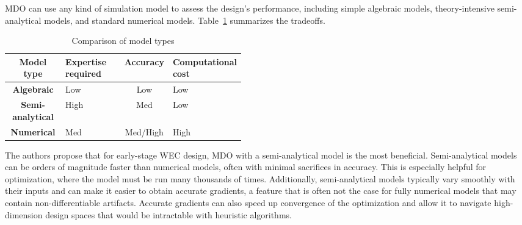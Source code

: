 

MDO can use any kind of simulation model to assess the design's performance, including simple algebraic models, theory-intensive semi-analytical models, and standard numerical models.
Table~\ref{tab:model-types} summarizes the tradeoffs.
\begin{table}
    \centering
    \begin{tabular}{c>{\centering\arraybackslash}p{0.25\linewidth}c>{\centering\arraybackslash}p{0.2\linewidth}} 
         \textbf{Model type}&  \textbf{Expertise required}&  \textbf{Accuracy}&  \textbf{Computational cost}\\ \hline
         \textbf{Algebraic}&  Low&  Low&  Low\\ 
         \textbf{Semi-analytical}&  High&  Med&  Low\\ 
         \textbf{Numerical}&  Med&  Med/High&  High\\ 
    \end{tabular}
    \caption{Comparison of model types}
    \label{tab:model-types}
\end{table}
The authors propose that for early-stage WEC design, MDO with a semi-analytical model is the most beneficial.
Semi-analytical models can be orders of magnitude faster than numerical models, often with minimal sacrifices in accuracy.
This is especially helpful for optimization, where the model must be run many thousands of times.
Additionally, semi-analytical models typically vary smoothly with their inputs and can make it easier to obtain accurate gradients, a feature that is often not the case for fully numerical models that may contain non-differentiable artifacts.
Accurate gradients can also speed up convergence of the optimization and allow it to navigate high-dimension design spaces that would be intractable with heuristic algorithms.


